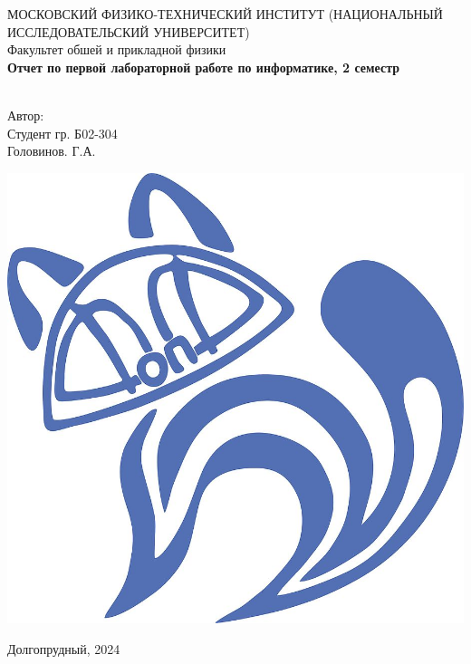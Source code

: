 \begin{titlepage}
	\begin{center}
		МОСКОВСКИЙ ФИЗИКО-ТЕХНИЧЕСКИЙ ИНСТИТУТ (НАЦИОНАЛЬНЫЙ ИССЛЕДОВАТЕЛЬСКИЙ УНИВЕРСИТЕТ) \\
		
		
		\hfill \break
		Факультет обшей и прикладной физики\\
		\vspace{2.5cm}
		\large{\textbf{Отчет по первой лабораторной работе по информатике, 2 семестр}}\\
		\hfill \break
		\\
	\end{center}
	
	\begin{flushright}
		Автор:\\
		Студент гр. Б02-304\\
		Головинов. Г.А.
	\end{flushright}
	
	\vspace{7cm}
	
	\begin{center}
		\includegraphics[width=0.15\linewidth]{uni}
	\end{center}
	
	
	
	
	\vfill
	
	\begin{center} Долгопрудный, 2024 \end{center}
	
	\thispagestyle{empty}
	
\end{titlepage}